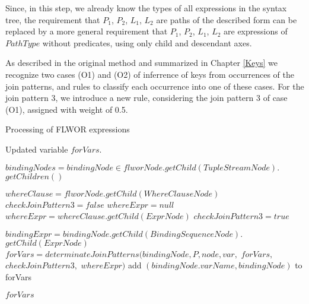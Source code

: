 Since, in this step, we already know the types of all expressions in the syntax tree, the requirement that $P_1$, $P_2$, $L_1$, $L_2$ are paths of the described form can be replaced by a more general requirement that $P_1$, $P_2$, $L_1$, $L_2$ are expressions of $PathType$ without predicates, using only child and descendant axes.

As described in the original method and summarized in Chapter \ref{Keys} we recognize two cases (O1) and (O2) of inferrence of keys from occurrences of the join patterns, and rules to classify each occurrence into one of these cases. For the join pattern 3, we introduce a new rule, considering the join pattern 3 of case (O1), assigned with weight of 0.5. 

\begin{algorithm}
\caption{Processing of FLWOR expressions}
\label{ALG_processing_of_flwor_expressions}
\begin{algorithmic}[1]

\ENSURE Updated variable $forVars$.

\STATE $bindingNodes = bindingNode \in flworNode.getChild(TupleStreamNode).$ $getChildren()$

\STATE $whereClause = flworNode.getChild(WhereClauseNode)$
\STATE $checkJoinPattern3 = false$
\STATE $whereExpr = null$
    \STATE $whereExpr = whereClause.getChild(ExprNode)$
        \STATE $checkJoinPattern3 = true$
    \ENDIF
\ENDIF

    \STATE $bindingExpr = bindingNode.getChild(BindingSequenceNode).$ $getChild(ExprNode)$
            \STATE $forVars = determinateJoinPatterns(bindingNode, P, node, var,$ $forVars,$ $checkJoinPattern3,$ $whereExpr)$
        \ENDFOR
            \STATE add $(bindingNode.varName, bindingNode)$ to forVars
        \ENDIF
    \ENDIF
\ENDFOR

\RETURN $forVars$
\end{algorithmic}
\end{algorithm}

